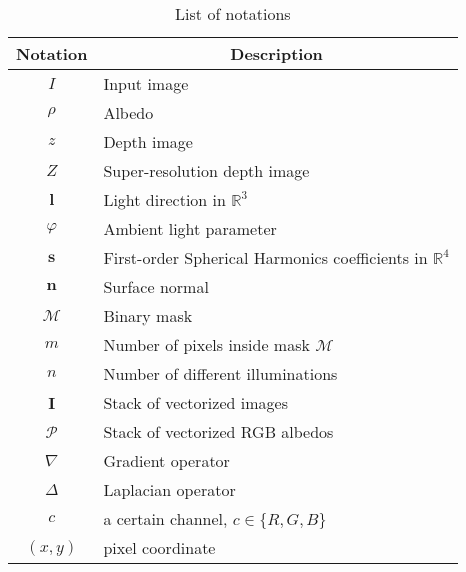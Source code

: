 \begin{table}[ht]
\centering
\caption{List of notations}
\vspace{0.1cm}
\bgroup
\def\arraystretch{1.4}%
\begin{tabular}{|c|l|}
\hline
Notation & \multicolumn{1}{c|}{Description} \\ \hline \hline
$I$           & Input image                      \\ \hline
$\rho$      & Albedo                                 \\ \hline
$z$      & Depth image                                 \\ \hline
$Z$      & Super-resolution depth image                                 \\ \hline
$\mathbf{l}$      & Light direction in $\mathbb{R}^3$                                 \\ \hline
$\varphi$      & Ambient light parameter                                 \\ \hline
$\mathbf{s}$      & First-order Spherical Harmonics coefficients in $\mathbb{R}^4$                                 \\ \hline
$\mathbf{n}$         & Surface normal                               \\ \hline
$\mathcal{M}$         & Binary mask                                 \\ \hline
$m$        & Number of pixels inside mask $\mathcal{M}$                                 \\ \hline
$n$         & Number of different illuminations                                 \\ \hline
$\mathbf{I}$         &  Stack of vectorized images                                \\ \hline
$\mathcal{P}$         & Stack of vectorized RGB albedos                                  \\ \hline
$\nabla$         & Gradient operator                                  \\ \hline
$\Delta$         & Laplacian operator                                  \\ \hline
$c$         & a certain channel, $c \in\{R,G,B\}$                                  \\ \hline
$(x,y)$   & pixel coordinate\\ \hline
\end{tabular}
\egroup
\end{table}

